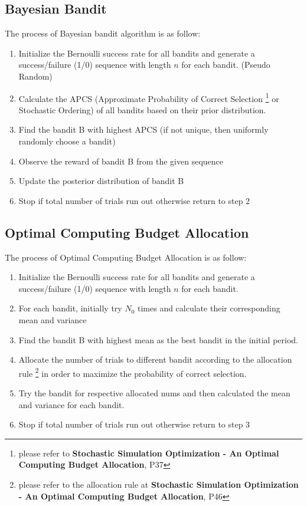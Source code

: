 \documentclass{article}
\begin{document}
\subsection{Bayesian Bandit}
The process of Bayesian bandit algorithm is as follow:
\begin{enumerate}
  \item Initialize the Bernoulli success rate for all bandits and generate a success/failure (1/0) sequence with length $n$ for each bandit. (Pseudo Random)
  \item Calculate the APCS (Approximate Probability of Correct Selection \footnote{please refer to \textbf{Stochastic Simulation Optimization - An Optimal Computing Budget Allocation}, P37} or Stochastic Ordering) of all bandits based on their prior distribution.
  \item Find the bandit B with highest APCS (if not unique, then uniformly randomly choose a bandit)
  \item Observe the reward of bandit B from the given sequence
  \item Update the posterior distribution of bandit B
  \item  Stop if total number of trials run out otherwise return to step 2
\end{enumerate}
\subsection{Optimal Computing Budget Allocation}
The process of Optimal Computing Budget Allocation is as follow:
\begin{enumerate}
  \item Initialize the Bernoulli success rate for all bandits and generate a success/failure (1/0) sequence with length $n$ for each bandit.
  \item For each bandit, initially try $N_{0}$ times and calculate their corresponding mean and variance
  \item Find the bandit B with highest mean as the best bandit in the initial period.
  \item Allocate the number of trials to different bandit according to the allocation rule \footnote{please refer to the allocation rule at \textbf{Stochastic Simulation Optimization - An Optimal Computing Budget Allocation}, P46} in order to maximize the probability of correct selection.
  \item Try the bandit for respective allocated nums and then calculated the mean and variance for each bandit.
  \item Stop if total number of trials run out otherwise return to step 3
\end{enumerate}
\end{document}
